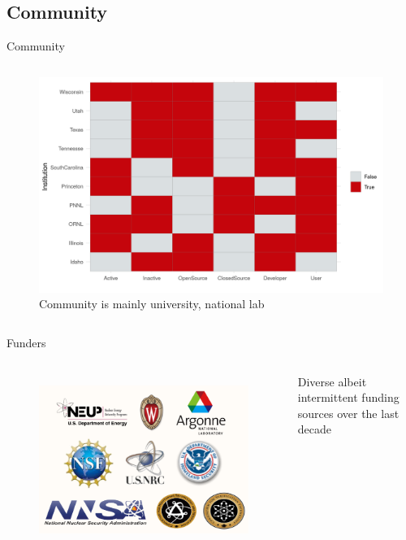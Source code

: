 \subsection{\Cyclus Community}
\begin{frame}{\Cyclus Community}
    \begin{columns}
    \begin{figure}
        \centering
        \includegraphics[width=\textwidth]{images/heat.png}
        \caption{Community is mainly university, national lab}
        \label{fig:my_label}
    \end{figure}
    \end{columns}
\end{frame}

\begin{frame}{\Cyclus Funders}
    \begin{columns}
    \begin{figure}
        \centering
        \includegraphics[width=\textwidth]{images/Cyclus-funders.png}
        \label{fig:my_label}
    \end{figure}
    Diverse albeit intermittent funding sources over the last decade
    \end{columns}
\end{frame}
